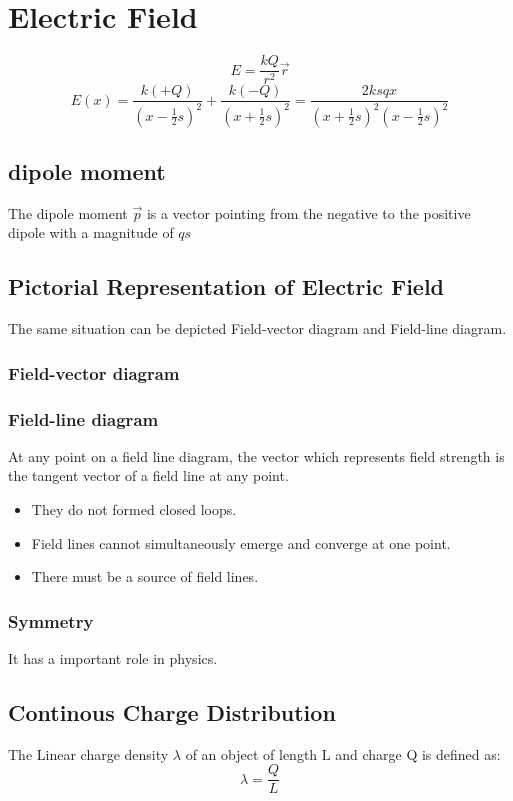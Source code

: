\documentclass[12pt]{article}
\begin{document}
\section{Electric Field}
\begin{displaymath}
E=\frac{kQ}{r^2}\vec{r}
\end{displaymath}
\begin{displaymath}
E(x)=\frac{k(+Q)}{(x-\frac{1}{2}s)^2}+\frac{k(-Q)}{(x+\frac{1}{2}s)^2}=\frac{2ksqx}{(x+\frac{1}{2}s)^2(x-\frac{1}{2}s)^2}
\end{displaymath}
\subsection{dipole moment}
The dipole moment $\vec{p}$ is a vector pointing from the negative to the positive dipole with a magnitude of $qs$
\subsection{Pictorial Representation of Electric Field}
The same situation can be depicted  Field-vector diagram and Field-line diagram.
\subsubsection{Field-vector diagram}
\subsubsection{Field-line diagram}
At any point on a field line diagram, the vector which represents field strength is the tangent vector of a field line at any point. \\
\begin{itemize}
\item They do not formed closed loops.
\item Field lines cannot simultaneously emerge and converge at one point.
\item There must be a source of field lines.
\end{itemize}
\subsubsection{Symmetry}
It has a important role in physics.

\subsection{Continous Charge Distribution}
The Linear charge density $\lambda$ of an object of length L and charge Q is defined as: \\
\begin{displaymath}
\lambda=\frac{Q}{L}
\end{displaymath}
\end{document}

